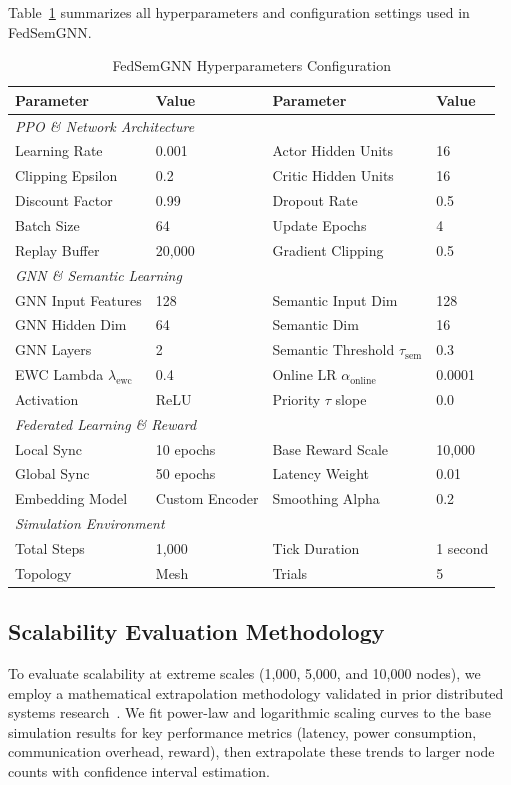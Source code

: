 Table~\ref{tab:hyperparameters} summarizes all hyperparameters and configuration settings used in FedSemGNN.

\begin{table}[t]
	\centering
	\caption{FedSemGNN Hyperparameters Configuration}
	\label{tab:hyperparameters}
	\scriptsize
	\begin{tabular}{@{}llll@{}}
		\toprule
		\textbf{Parameter} & \textbf{Value} & \textbf{Parameter} & \textbf{Value} \\
		\midrule
		\multicolumn{4}{l}{\textit{PPO \& Network Architecture}} \\
		Learning Rate & 0.001 & Actor Hidden Units & 16 \\
		Clipping Epsilon & 0.2 & Critic Hidden Units & 16 \\
		Discount Factor & 0.99 & Dropout Rate & 0.5 \\
		Batch Size & 64 & Update Epochs & 4 \\
		Replay Buffer & 20,000 & Gradient Clipping & 0.5 \\
		\midrule
		\multicolumn{4}{l}{\textit{GNN \& Semantic Learning}} \\
		GNN Input Features & 128 & Semantic Input Dim & 128 \\
		GNN Hidden Dim & 64 & Semantic Dim & 16 \\
		GNN Layers & 2 & Semantic Threshold $\tau_{\text{sem}}$ & 0.3 \\
		EWC Lambda $\lambda_{\text{ewc}}$ & 0.4 & Online LR $\alpha_{\text{online}}$ & 0.0001 \\
		Activation & ReLU & Priority $\tau$ slope & 0.0 \\
		\midrule
		\multicolumn{4}{l}{\textit{Federated Learning \& Reward}} \\
		Local Sync & 10 epochs & Base Reward Scale & 10,000 \\
		Global Sync & 50 epochs & Latency Weight & 0.01 \\
		Embedding Model & Custom Encoder & Smoothing Alpha & 0.2 \\
		\midrule
		\multicolumn{4}{l}{\textit{Simulation Environment}} \\
		Total Steps & 1,000 & Tick Duration & 1 second \\
		Topology & Mesh & Trials & 5 \\
		\bottomrule
	\end{tabular}
\end{table}

\subsection{Scalability Evaluation Methodology}
To evaluate scalability at extreme scales (1,000, 5,000, and 10,000 nodes), we employ a mathematical extrapolation methodology validated in prior distributed systems research~\cite{Bonawitz2019TowardsFL, Li2020_FederatedOptimization}. We fit power-law and logarithmic scaling curves to the base simulation results for key performance metrics (latency, power consumption, communication overhead, reward), then extrapolate these trends to larger node counts with confidence interval estimation.

